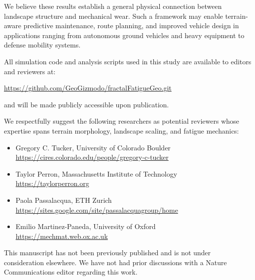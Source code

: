 \documentclass[11pt]{article}
\begin{document}
\vspace{0.4cm}

\noindent
We believe these results establish a general physical connection between landscape structure and mechanical wear. Such a framework may enable terrain-aware predictive maintenance, route planning, and improved vehicle design in applications ranging from autonomous ground vehicles and heavy equipment to defense mobility systems.

\vspace{0.4cm}

\noindent
All simulation code and analysis scripts used in this study are available to editors and reviewers at:

\begin{center}
\url{https://github.com/GeoGizmodo/fractalFatigueGeo.git}
\end{center}

\noindent
and will be made publicly accessible upon publication.

\vspace{0.4cm}

\noindent
We respectfully suggest the following researchers as potential reviewers whose expertise spans terrain morphology, landscape scaling, and fatigue mechanics:

\begin{itemize}
\item Gregory C. Tucker, University of Colorado Boulder \\
\url{https://cires.colorado.edu/people/gregory-c-tucker}

\item Taylor Perron, Massachusetts Institute of Technology \\
\url{https://taylorperron.org}

\item Paola Passalacqua, ETH Zurich \\
\url{https://sites.google.com/site/passalacquagroup/home}

\item Emilio Martinez-Paneda, University of Oxford \\
\url{https://mechmat.web.ox.ac.uk}
\end{itemize}

\vspace{0.4cm}

\noindent
This manuscript has not been previously published and is not under consideration elsewhere. We have not had prior discussions with a Nature Communications editor regarding this work.
\end{document}
